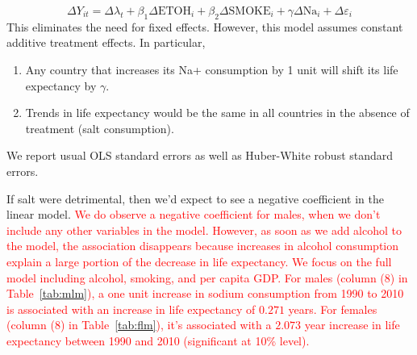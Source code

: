 \documentclass[11pt]{article}\usepackage[]{graphicx}\usepackage[]{color}
\newcommand{\eps}{\varepsilon}
\begin{document}
$$\Delta Y_{it} =  \Delta \lambda_t + \beta_1\Delta \text{ETOH}_{i} + \beta_2\Delta \text{SMOKE}_{i} + \gamma\Delta \text{Na}_{i} + \Delta \eps_{i}$$
This eliminates the need for fixed effects.
However, this model assumes constant additive treatment effects.
In particular,
\begin{enumerate}
\item Any country that increases its Na+ consumption by 1 unit will shift its life expectancy by $\gamma$.
\item Trends in life expectancy would be the same in all countries in the absence of treatment (salt consumption).
\end{enumerate}

We report usual OLS standard errors as well as Huber-White robust standard errors.

If salt were detrimental, then we'd expect to see a negative coefficient in the linear model.
\textcolor{red}{
We do observe a negative coefficient for males, when we don't include any other variables in the model.
However, as soon as we add alcohol to the model, the association disappears because increases in alcohol consumption explain a large portion of the decrease in life expectancy.
We focus on the full model including alcohol, smoking, and per capita GDP.
For males (column (8) in Table~\ref{tab:mlm}), a one unit increase in sodium consumption from 1990 to 2010 is associated with an increase in life expectancy of $0.271$ years.
For females (column (8) in Table~\ref{tab:flm}), it's associated with a $2.073$ year increase in life expectancy between 1990 and 2010 (significant at 10\% level).
}
\end{document}
